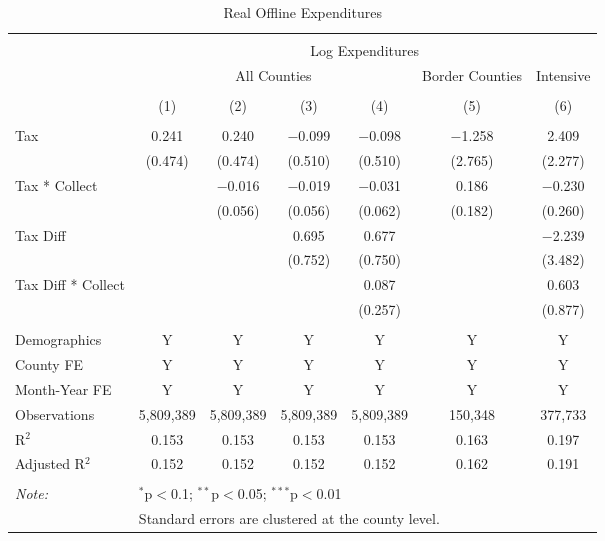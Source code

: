 
\begin{table}[!htbp] \centering 
  \caption{Real Offline Expenditures} 
  \label{} 
\begin{tabular}{@{\extracolsep{5pt}}lcccccc} 
\\[-1.8ex]\hline 
\hline \\[-1.8ex] 
 & \multicolumn{6}{c}{Log Expenditures} \\ 
\cline{2-7} 
 & \multicolumn{4}{c}{All Counties} & Border Counties & Intensive \\ 
\\[-1.8ex] & (1) & (2) & (3) & (4) & (5) & (6)\\ 
\hline \\[-1.8ex] 
 Tax & 0.241 & 0.240 & $-$0.099 & $-$0.098 & $-$1.258 & 2.409 \\ 
  & (0.474) & (0.474) & (0.510) & (0.510) & (2.765) & (2.277) \\ 
  Tax * Collect &  & $-$0.016 & $-$0.019 & $-$0.031 & 0.186 & $-$0.230 \\ 
  &  & (0.056) & (0.056) & (0.062) & (0.182) & (0.260) \\ 
  Tax Diff &  &  & 0.695 & 0.677 &  & $-$2.239 \\ 
  &  &  & (0.752) & (0.750) &  & (3.482) \\ 
  Tax Diff * Collect &  &  &  & 0.087 &  & 0.603 \\ 
  &  &  &  & (0.257) &  & (0.877) \\ 
 \hline \\[-1.8ex] 
Demographics & Y & Y & Y & Y & Y & Y \\ 
County FE & Y & Y & Y & Y & Y & Y \\ 
Month-Year FE & Y & Y & Y & Y & Y & Y \\ 
Observations & 5,809,389 & 5,809,389 & 5,809,389 & 5,809,389 & 150,348 & 377,733 \\ 
R$^{2}$ & 0.153 & 0.153 & 0.153 & 0.153 & 0.163 & 0.197 \\ 
Adjusted R$^{2}$ & 0.152 & 0.152 & 0.152 & 0.152 & 0.162 & 0.191 \\ 
\hline 
\hline \\[-1.8ex] 
\textit{Note:}  & \multicolumn{6}{l}{$^{*}$p$<$0.1; $^{**}$p$<$0.05; $^{***}$p$<$0.01} \\ 
 & \multicolumn{6}{l}{Standard errors are clustered at the county level.} \\ 
\end{tabular} 
\end{table} 
